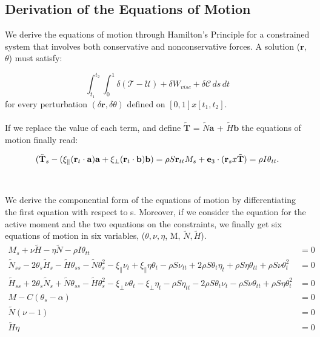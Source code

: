 \subsection{Derivation of the Equations of Motion}
We derive the equations of motion through Hamilton's Principle for a constrained system that involves both conservative and nonconservative forces. A solution ($\mathbf{r}$,$\theta$) must satisfy:

\[\int_{t_1}^{t_2} \int_{0}^{1} \delta (\mathcal{T}-\mathcal{U}) + \delta W_{visc} + \delta \mathcal{C} \, ds \,dt
\]
for every perturbation $(\delta \mathbf{r}, \delta \theta)$ defined on $[0,1]x[t_1,t_2]$. 
\\\\
If we replace the value of each term, and define $\tilde{\mathbf{T}}$ = $\tilde{N}\mathbf{a}$ + $\tilde{H}\mathbf{b}$  the equations of motion finally read:

\[ (\tilde{\mathbf{T}}_s - (\xi_\parallel (\mathbf{r}_t\cdot\mathbf{a})\mathbf{a} + \xi_\perp (\mathbf{r}_t\cdot\mathbf{b})\mathbf{b}) = \rho S \mathbf{r}_{tt}\\

M_s + \mathbf{e}_3 \cdot(\mathbf{r}_s x \mathbf{\tilde{T}}) =\rho I \theta_{tt}.
\]
\\\\
We derive the componential form of the equations of motion by differentiating the first equation with respect to s.
Moreover, if we consider the equation for the active moment and the two equations on the constraints, we finally get six equations of motion in six variables, ($\theta,\nu,\eta$, M, $\tilde{N},\tilde{H}$).
\begin{align}
M_s + \nu \tilde{H} -\eta \tilde{N} - \rho I \theta_{tt}
&= 0\\
\tilde{N}_{ss} - 2\theta_s\tilde{H}_s - \tilde{H}\theta_{ss}- \tilde{N}\theta_s^2
- \xi_{\parallel}\nu_t + \xi_{\parallel}\eta\theta_t - \rho S \nu_{tt} + 2\rho S \theta_t\eta_t + \rho S \eta\theta_{tt} + \rho S \nu\theta_t^2
&= 0\\
\tilde{H}_{ss} + 2\theta_s\tilde{N}_s + \tilde{N}\theta_{ss} - \tilde{H}\theta_s^2  - \xi_{\perp}\nu\theta_t - \xi_{\perp}\eta_t
 - \rho S \eta_{tt} - 2\rho S \theta_t\nu_t -\rho S \nu\theta_{tt} + \rho S \eta\theta_t^2
&= 0\\
M - C(\theta_s -\alpha)  &= 0\\
\tilde{N}(\nu - 1) &= 0\\
\tilde{H}\eta &= 0
\end{align}

